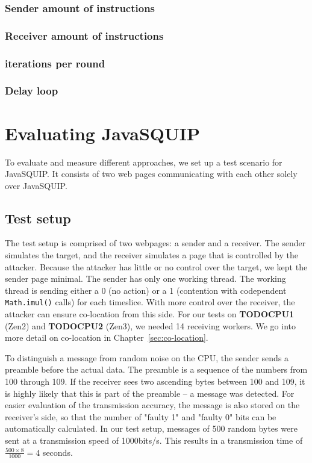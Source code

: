 \documentclass[11pt,
  titlepage=false,
]{scrreprt}
\begin{document}
\subsection{Sender amount of instructions}

\subsection{Receiver amount of instructions}

\subsection{iterations per round}

\subsection{Delay loop}

\chapter{Evaluating JavaSQUIP}
\label{ch:evaluation}

To evaluate and measure different approaches, we set up a test scenario for JavaSQUIP.
It consists of two web pages communicating with each other solely over JavaSQUIP.

\section {Test setup}
\label{sec:testsetup}
The test setup is comprised of two webpages: a sender and a receiver.
The sender simulates the target, and the receiver simulates a page that is controlled by the attacker.
Because the attacker has little or no control over the target, we kept the sender page minimal.
The sender has only one working thread.
The working thread is sending either a 0 (no action) or a 1 (contention with codependent \texttt{Math.imul()} calls) for each timeslice.
With more control over the receiver, the attacker can ensure co-location from this side.
For our tests on \textbf{TODOCPU1} (Zen2) and \textbf{TODOCPU2} (Zen3), we needed 14 receiving workers.
We go into more detail on co-location in Chapter~\ref{sec:co-location}.

To distinguish a message from random noise on the CPU, the sender sends a preamble before the actual data.
The preamble is a sequence of the numbers from 100 through 109.
If the receiver sees two ascending bytes between 100 and 109, it is highly likely that this is part of the preamble --
a message was detected.
For easier evaluation of the transmission accuracy, the message is also stored on the receiver's side,
so that the number of "faulty 1" and "faulty 0" bits can be automatically calculated.
In our test setup, messages of 500 random bytes were sent at a transmission speed of 1000bits/s.
This results in a transmission time of $\frac{500 \times 8}{1000} = 4$ seconds.
\end{document}
